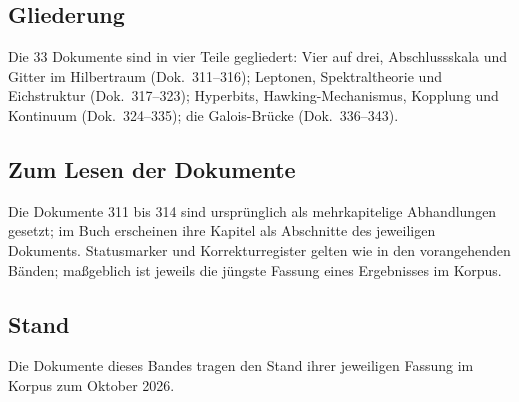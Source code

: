 \subsection*{Gliederung}

Die 33 Dokumente sind in vier Teile gegliedert: Vier auf drei,
Abschlussskala und Gitter im Hilbertraum (Dok.~311--316); Leptonen,
Spektraltheorie und Eichstruktur (Dok.~317--323); Hyperbits,
Hawking-Mechanismus, Kopplung und Kontinuum (Dok.~324--335); die
Galois-Brücke (Dok.~336--343).

\subsection*{Zum Lesen der Dokumente}

Die Dokumente 311 bis 314 sind ursprünglich als mehrkapitelige Abhandlungen
gesetzt; im Buch erscheinen ihre Kapitel als Abschnitte des jeweiligen
Dokuments. Statusmarker und Korrekturregister gelten wie in den
vorangehenden Bänden; maßgeblich ist jeweils die jüngste Fassung eines
Ergebnisses im Korpus.

\subsection*{Stand}

Die Dokumente dieses Bandes tragen den Stand ihrer jeweiligen Fassung im
Korpus zum Oktober 2026.
